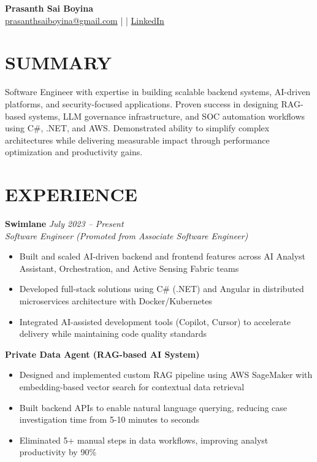 \documentclass[letterpaper,11pt]{article}
\begin{document}
\begin{center}
    {\LARGE \textbf{Prasanth Sai Boyina}} \\
    \vspace{2pt}
    \href{mailto:prasanthsaiboyina@gmail.com}{prasanthsaiboyina@gmail.com} \;| \;|\;
    \href{https://in.linkedin.com/in/prasanth-sai-b-b6029823b}{LinkedIn}
\end{center}

\vspace{-8pt}

\section*{SUMMARY}
Software Engineer with expertise in building scalable backend systems, AI-driven platforms, and security-focused applications. Proven success in designing RAG-based systems, LLM governance infrastructure, and SOC automation workflows using C\#, .NET, and AWS. Demonstrated ability to simplify complex architectures while delivering measurable impact through performance optimization and productivity gains.

\vspace{-6pt}

\section*{EXPERIENCE}

\textbf{Swimlane} \hfill \textit{July 2023 -- Present} \\
\textit{Software Engineer (Promoted from Associate Software Engineer)}

\begin{itemize}
    \item Built and scaled AI-driven backend and frontend features across AI Analyst Assistant, Orchestration, and Active Sensing Fabric teams
    \item Developed full-stack solutions using C\# (.NET) and Angular in distributed microservices architecture with Docker/Kubernetes
    \item Integrated AI-assisted development tools (Copilot, Cursor) to accelerate delivery while maintaining code quality standards
\end{itemize}

\textbf{Private Data Agent (RAG-based AI System)}
\begin{itemize}
    \item Designed and implemented custom RAG pipeline using AWS SageMaker with embedding-based vector search for contextual data retrieval
    \item Built backend APIs to enable natural language querying, reducing case investigation time from 5-10 minutes to seconds
    \item Eliminated 5+ manual steps in data workflows, improving analyst productivity by 90\%
\end{itemize}
\end{document}
